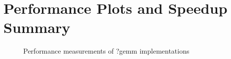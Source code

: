 \clearpage

\section{Performance Plots and Speedup Summary}

\begin{figure}[htb]
    \centering
    \caption*{Performance measurements of ?gemm implementations}
    \label{fig:mtm_col_Sgflop220}
    \qquad
    \label{fig:mtm_col_Dgflop220}
\end{figure}

